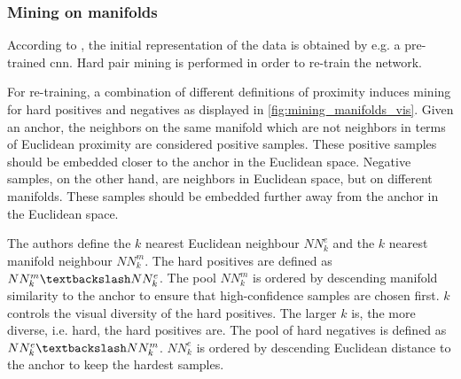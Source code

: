 \subsubsection{Mining on manifolds}\label{subsec:mining_manifolds}




According to \citet{mining_manifolds_2018}, the initial representation of the data is obtained by e.g. a pre-trained \ac{cnn}.
Hard pair mining is performed in order to re-train the network.

For re-training, a combination of different definitions of proximity induces mining 
for hard positives and negatives as displayed in \autoref{fig:mining_manifolds_vis}.
Given an anchor, the neighbors on the same manifold which are not neighbors in terms of 
Euclidean proximity are considered positive samples.
These positive samples should be embedded closer to the anchor in the Euclidean space.
Negative samples, on the other hand, are neighbors in Euclidean space, 
but on different manifolds.
These samples should be embedded further away from the anchor in the Euclidean space.

The authors define the $k$ nearest Euclidean neighbour $NN^e_k$ and 
the $k$ nearest manifold neighbour $NN^m_k$.
The hard positives are defined as $NN^m_k \textbackslash NN^e_k$. 
The pool $NN^m_k$ is ordered by descending manifold similarity to the anchor
to ensure that high-confidence samples are chosen first.
$k$ controls the visual diversity of the hard positives.
The larger $k$ is, the more diverse, i.e. hard, the hard positives are. 
The pool of hard negatives is defined as $NN^e_k \textbackslash NN^m_k$.
$NN^e_k$ is ordered by descending Euclidean distance to the anchor to keep the hardest samples.

